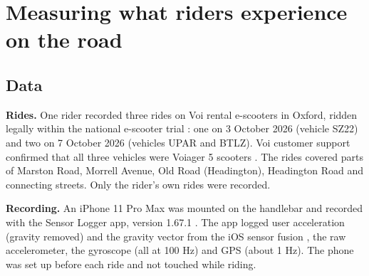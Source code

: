 
\section{Measuring what riders experience on the road}\label{measuring-what-riders-experience-on-the-road}

\subsection{Data}\label{data}

\textbf{Rides.} One rider recorded three rides on Voi rental e-scooters in Oxford, ridden
legally within the national e-scooter trial \autocite{dft2024guidance,occ_trial}: one on
3 October 2026 (vehicle SZ22) and two on 7 October 2026 (vehicles UPAR and BTLZ). Voi
customer support confirmed that all three vehicles were Voiager 5 scooters
\autocite{voi2026support_rec01,voi2026support_rec0203}. The rides covered parts of Marston
Road, Morrell Avenue, Old Road (Headington), Headington Road and connecting streets.
Only the rider's own rides were recorded.

\textbf{Recording.} An iPhone 11 Pro Max was mounted on the handlebar and recorded with the
Sensor Logger app, version 1.67.1 \autocite{sensorlogger}. The app logged user acceleration
(gravity removed) and the gravity vector from the iOS sensor fusion
\autocite{apple_cmdevicemotion}, the raw accelerometer, the gyroscope (all at 100 Hz) and GPS
(about 1 Hz). The phone was set up before each ride and not touched while riding.


